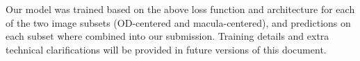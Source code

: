 Our model was trained based on the above loss function and architecture for each of the two image subsets (OD-centered and macula-centered), and predictions on each subset where combined into our submission. Training details and extra technical clarifications will be provided in future versions of this document.




